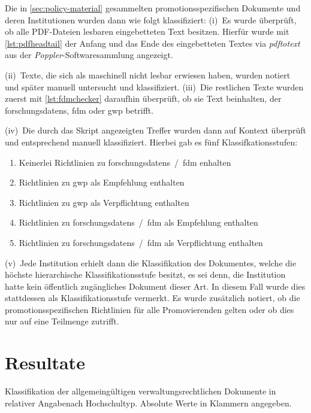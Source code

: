 Die in \cref{sec:policy-material} gesammelten promotionsspezifischen Dokumente und deren Institutionen wurden dann wie folgt klassifiziert:
(i)~Es wurde überprüft, ob alle PDF-Dateien lesbaren eingebetteten Text besitzen.
Hierfür wurde mit \cref{lst:pdfheadtail} der Anfang und das Ende des eingebetteten Textes via \emph{pdftotext} aus der \emph{Poppler}-Softwaresammlung \autocite{Poppler} angezeigt.

(ii)~Texte, die sich als maschinell nicht lesbar erwiesen haben, wurden notiert und später manuell untersucht und klassifiziert.
(iii)~Die restlichen Texte wurden zuerst mit \cref{lst:fdmchecker} daraufhin überprüft, ob sie Text beinhalten, der \glspl{forschungsdaten}, \gls{fdm} oder \gls{gwp} betrifft.

(iv)~Die durch das Skript angezeigten Treffer wurden dann auf Kontext überprüft und entsprechend manuell klassifiziert.
Hierbei gab es fünf Klassifkationsstufen:
\begin{enumerate}
    \item Keinerlei Richtlinien zu \glspl{forschungsdaten}~/~\gls{fdm} enhalten
    \item Richtlinien zu \gls{gwp} als Empfehlung enthalten
    \item Richtlinien zu \gls{gwp} als Verpflichtung enthalten
    \item Richtlinien zu \glspl{forschungsdaten}~/~\gls{fdm} als Empfehlung enthalten
    \item Richtlinien zu \glspl{forschungsdaten}~/~\gls{fdm} als Verpflichtung enthalten
\end{enumerate}
(v)~Jede Institution erhielt dann die Klassifikation des Dokumentes, welche die höchste hierarchische Klassifikationsstufe besitzt, es sei denn, die Institution hatte kein öffentlich zugängliches Dokument dieser Art.
In diesem Fall wurde dies stattdessen als Klassifikationsstufe vermerkt.
Es wurde zusätzlich notiert, ob die promotionsspezifischen Richtlinien für alle Promovierenden gelten oder ob dies nur auf eine Teilmenge zutrifft.

\section{Resultate}\label{sec:policy-results}
\begin{table}[!htbp]
	\caption{Klassifikation der allgemeingültigen verwaltungsrechtlichen Dokumente in relativer Angabenach Hochschultyp. Absolute Werte in Klammern angegeben.}
    
	\label{tab:stichprobe-klassifikation}
\end{table}

